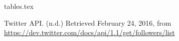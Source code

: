 \documentclass{article}
\begin{document}
{tables.tex}
\newpage
\begin{thebibliography}{9}
%
Twitter API. (n.d.) Retrieved February 24, 2016, from 
\url{https://dev.twitter.com/docs/api/1.1/get/followers/list}


\end{thebibliography}
\end{document}
